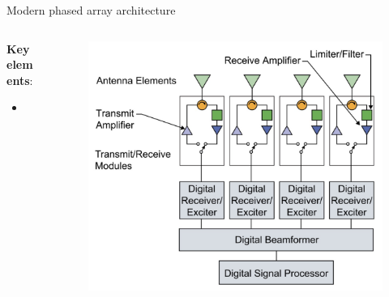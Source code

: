 \documentclass[../main.tex]{subfiles}
\begin{document}
\begin{frame}[t]{Modern phased array architecture}

\begin{columns}[t]
    \begin{column}{0.3\textwidth}
    \textbf{Key elements}:
    \begin{itemize}
        \item 
    \end{itemize}        
    \end{column}
    \begin{column}{0.7\textwidth}
        \begin{figure}[H]
        \begin{adjustbox}{width=0.75\linewidth}
        \includegraphics{pics/antenna_structure.jpg}
        \end{adjustbox}
        \end{figure}
    \end{column}
\end{columns}

\end{frame}



%
%
\end{document}
